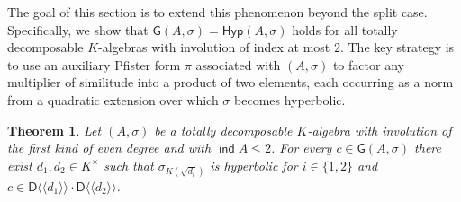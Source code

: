 \documentclass[twoside,11pt]{amsart}
\numberwithin{equation}{section}
\newtheorem{thm}[equation]{Theorem}
\theoremstyle{definition}
\newcommand\ind{\operatorname{\mathsf{ind}}}
\newcommand{\mg}[1]{{#1}^{\times}}
\newcommand{\s}{\sigma}
\newcommand{\la}{\langle}
\newcommand{\ra}{\rangle}
\newcommand{\lla}{\la\!\la}
\newcommand{\rra}{\ra\!\ra}
\renewcommand{\leq}{\leqslant}
\newcommand{\G}{\mathsf{G}}
\newcommand{\Hyp}{\mathsf{Hyp}}
\newcommand{\D}{\mathsf{D}}
\begin{document}
The goal of this section is to extend this phenomenon beyond the split case. 
Specifically, we show that $\G(A,\sigma) = \Hyp(A,\sigma)$ holds for all totally decomposable $K$-algebras with involution of index at most $2$. The key strategy is to use an auxiliary Pfister form $\pi$ associated with $(A,\sigma)$ to factor any multiplier of similitude into a product of two elements, each occurring as a norm from a quadratic extension over which $\s$ becomes hyperbolic.

\begin{thm}\label{T:main}
    Let $(A,\sigma)$ be a totally decomposable $K$-algebra with  involution of the first kind of even degree and with $\ind A\leq 2$. 
    For every $c\in\G(A,\s)$ there exist $d_1,d_2\in\mg{K}$ such that $\s_{K(\sqrt{d_i})}$ is hyperbolic for $i\in\{1,2\}$ and $c\in\D\lla d_1\rra\cdot \D\lla d_2\rra$.
\end{thm}
\end{document}
